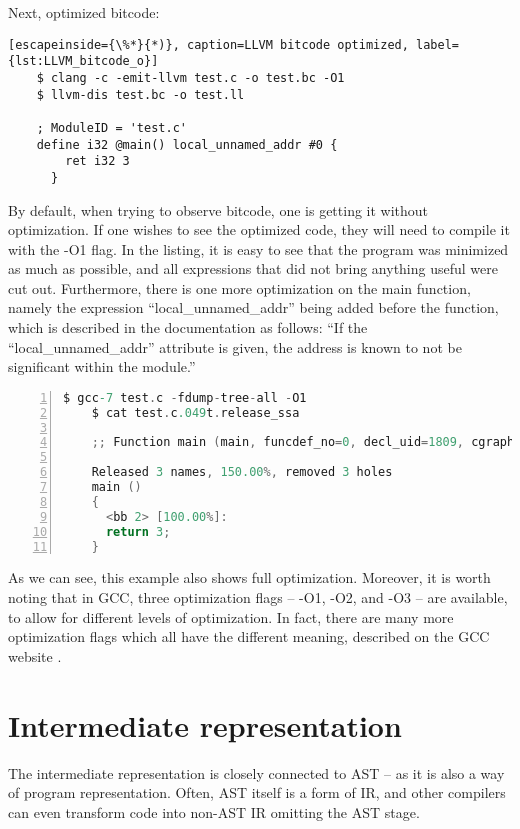Next, optimized bitcode:
\begin{lstlisting}[escapeinside={\%*}{*)}, caption=LLVM bitcode optimized, label={lst:LLVM_bitcode_o}]
    $ clang -c -emit-llvm test.c -o test.bc -O1
    $ llvm-dis test.bc -o test.ll

    ; ModuleID = 'test.c'
    define i32 @main() local_unnamed_addr #0 {
        ret i32 3
      }
\end{lstlisting} 
By default, when trying to observe bitcode, one is getting it without optimization. If one wishes to see the optimized code, they will need to compile it with the -O1 flag. In the listing, it is easy to see that the program was minimized as much as possible, and all expressions that did not bring anything useful were cut out. Furthermore, there is one more optimization on the main function, namely the expression ``local\_unnamed\_addr'' being added before the function, which is described in the documentation as follows: ``If the ``local\_unnamed\_addr'' attribute is given, the address is known to not be significant within the module.'' \cite{LLVM_manual}


\begin{lstlisting}[frame=L, language=C, numbers=left,basicstyle=\footnotesize, caption={Release GCC gimple in SSA form}, label={lst:GCC_gimple_optimized}]
    $ gcc-7 test.c -fdump-tree-all -O1
    $ cat test.c.049t.release_ssa

    ;; Function main (main, funcdef_no=0, decl_uid=1809, cgraph_uid=0, symbol_order=0) (executed once)
    
    Released 3 names, 150.00%, removed 3 holes
    main ()
    {
      <bb 2> [100.00%]:
      return 3;
    }
\end{lstlisting}
As we can see, this example also shows full optimization. Moreover, it is worth noting that in GCC, three optimization flags -- -O1, -O2, and -O3 -- are available, to allow for different levels of optimization. In fact, there are many more optimization flags which all have the different meaning, described on the GCC website \cite{GCC_optimizations}.

\section{Intermediate representation}
The intermediate representation is closely connected to AST -- as it is also a way of program representation. Often, AST itself is a form of IR, and other compilers\cite{Non_AST_compilers} can even transform code into non-AST IR omitting the AST stage. 

